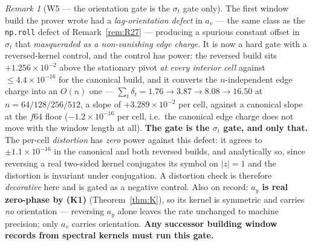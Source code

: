 \documentclass[11pt]{article}
\theoremstyle{definition}
\theoremstyle{remark}
\newtheorem{remark}{Remark}
\begin{document}
\begin{remark}[W5 --- the orientation gate is the $\sigma_t$ gate only]
\label{rem:W5}
The first window build the prover wrote had a \emph{lag-orientation defect} in
$a_v$ --- the same class as the \texttt{np.roll} defect of
Remark~\ref{rem:R27} --- producing a spurious constant offset in $\sigma_t$
that \emph{masqueraded as a non-vanishing edge charge}. It is now a hard gate
with a reversed-kernel control, and the control has power: the reversed build
sits $+1.256\times10^{-2}$ above the stationary pivot \emph{at every interior
cell} against $\le4.4\times10^{-16}$ for the canonical build, and it converts
the $n$-independent edge charge into an $O(n)$ one ---
$\sum_t\delta_t=1.76\to3.87\to8.08\to16.50$ at $n=64/128/256/512$, a slope of
$+3.289\times10^{-2}$ per cell, against a canonical slope at the $f64$ floor
($-1.2\times10^{-16}$ per cell, i.e.\ the canonical edge charge does not move
with the window length at all).
\textbf{The gate is the $\sigma_t$ gate, and only that.} The per-cell
\emph{distortion} has \emph{zero} power against this defect: it agrees to
$\pm1.1\times10^{-16}$ in the canonical and both reversed builds, and
analytically so, since reversing a real two-sided kernel conjugates its symbol
on $|z|=1$ and the distortion is invariant under conjugation. A distortion
check is therefore \emph{decorative} here and is gated as a negative control.
Also on record: \textbf{$a_y$ is real zero-phase by (K1)}
(Theorem~\ref{thm:K}), so its kernel is symmetric and carries \emph{no}
orientation --- reversing $a_y$ alone leaves the rate unchanged to machine
precision; only $a_v$ carries orientation. \textbf{Any successor building
window records from spectral kernels must run this gate.}
\end{remark}
\end{document}
